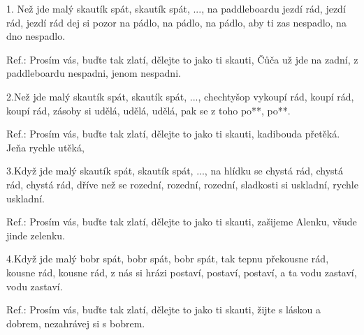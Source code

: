 
1. Než jde malý skautík spát, skautík spát, ...,
na paddleboardu jezdí rád, jezdí rád, jezdí rád
dej si pozor na pádlo, na pádlo, na pádlo,
aby ti zas nespadlo, na dno nespadlo.

Ref.: Prosím vás, buďte tak zlatí,
dělejte to jako ti skauti,
Čůča už jde na zadní,
z paddleboardu nespadni, jenom nespadni.

2.Než jde malý skautík spát, skautík spát, ...,
chechtyšop vykoupí rád, koupí rád, koupí rád,
zásoby si udělá, udělá, udělá,
pak se z toho po**, po**.

Ref.: Prosím vás, buďte tak zlatí,
dělejte to jako ti skauti,
kadibouda přetěká.
Jeňa rychle utěká,

3.Když jde malý skautík spát, skautík spát, ...,
na hlídku se chystá rád, chystá rád, chystá rád,
dříve než se rozední, rozední, rozední,
sladkosti si uskladní, rychle uskladní.

Ref.: Prosím vás, buďte tak zlatí,
dělejte to jako ti skauti,
zašijeme Alenku,
všude jinde zelenku.

4.Když jde malý bobr spát, bobr spát, bobr spát,
tak tepnu překousne rád, kousne rád, kousne rád,
z nás si hrázi postaví, postaví, postaví,
a ta vodu zastaví, vodu zastaví.

Ref.: Prosím vás, buďte tak zlatí,
dělejte to jako ti skauti,
žijte s láskou a dobrem,
nezahrávej si s bobrem.

